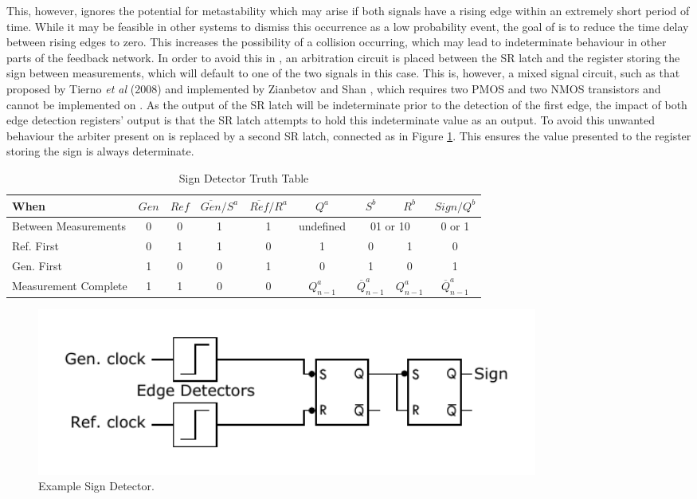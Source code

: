 This, however, ignores the potential for metastability which may arise if both signals have a rising edge within an extremely short period of time. While it may be feasible in other systems to dismiss this occurrence as a low probability event, the goal of  is to reduce the time delay between rising edges to zero. This increases the possibility of a collision occurring, which may lead to indeterminate behaviour in other parts of the feedback network. In order to avoid this in , an arbitration circuit is placed between the \ac{SR} latch and the register storing the sign between measurements, which will default to one of the two signals in this case. This is, however, a mixed signal circuit, such as that proposed by Tierno \textit{et al} (2008) and implemented by Zianbetov and Shan \cite{tierno2008wide,zianbetov2013phd,shan2014phd}, which requires two \ac{PMOS} and two \ac{NMOS} transistors and cannot be implemented on . As the output of the \ac{SR} latch will be indeterminate prior to the detection of the first edge, the impact of both edge detection registers' output is that the \ac{SR} latch attempts to hold this indeterminate value as an output. To avoid this unwanted behaviour the arbiter present on  is replaced by a second \ac{SR} latch, connected as in Figure \ref{fig:arbitration}. This ensures the value presented to the register storing the sign is always determinate.
\begin{table}[!ht]
	\begin{center}
		\setlength{\tabcolsep}{.5\tabcolsep}
		\begin{tabular}{l|cc|cc|c|cc|c}           
			When&$Gen$&$Ref$&$\overline{Gen}/S^a$&$\overline{Ref}/R^a$&$Q^a$&$S^b$&$R^b$&$Sign/Q^b$\\
			\hline
			Between Measurements&0&0&1&1&\multicolumn{1}{c|}{undefined}&\multicolumn{2}{c|}{01 or 10}&\multicolumn{1}{c}{0 or 1}\T\\
			Ref. First&0&1&1&0&1&0&1&0\T\\
			Gen. First&1&0&0&1&0&1&0&1\T\\	
			Measurement Complete&1&1&0&0&$Q^a_{n-1}$&$\overline{Q}^a_{n-1}$&$Q^a_{n-1}$&$\overline{Q}^a_{n-1}$\T\\					
		\end{tabular}
		\caption[Sign Detector Truth Table]{Sign Detector Truth Table}
		\label{table:sign_tt}
	\end{center}
\end{table}
\begin{figure}[h]
	\centering
	\includegraphics[width=0.8\textwidth]{../simple_sign_detection}
	\caption[Example Sign Detector]{Example Sign Detector.}
	\label{fig:arbitration}
\end{figure}

